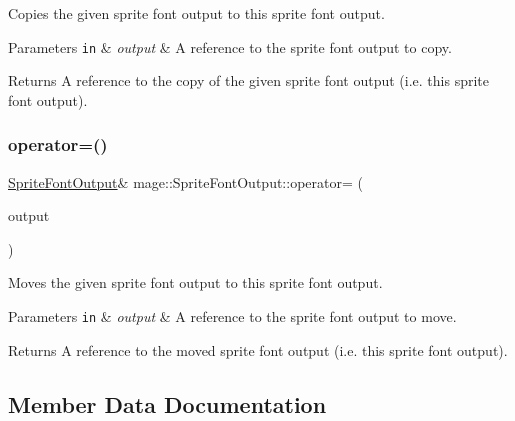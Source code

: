 Copies the given sprite font output to this sprite font output.


\begin{DoxyParams}[1]{Parameters}
\mbox{\tt in}  & {\em output} & A reference to the sprite font output to copy. \\
\hline
\end{DoxyParams}
\begin{DoxyReturn}{Returns}
A reference to the copy of the given sprite font output (i.\+e. this sprite font output). 
\end{DoxyReturn}
\hypertarget{structmage_1_1_sprite_font_output_a5433b918576d7e6724ed46046724a753}{}\label{structmage_1_1_sprite_font_output_a5433b918576d7e6724ed46046724a753} 
\subsubsection{\texorpdfstring{operator=()}{operator=()}\hspace{0.1cm}{\footnotesize\ttfamily [2/2]}}
{\footnotesize\ttfamily \hyperlink{structmage_1_1_sprite_font_output}{Sprite\+Font\+Output}\& mage\+::\+Sprite\+Font\+Output\+::operator= (\begin{DoxyParamCaption}\item[{\hyperlink{structmage_1_1_sprite_font_output}{Sprite\+Font\+Output} \&\&}]{output }\end{DoxyParamCaption})\hspace{0.3cm}{\ttfamily [delete]}}

Moves the given sprite font output to this sprite font output.


\begin{DoxyParams}[1]{Parameters}
\mbox{\tt in}  & {\em output} & A reference to the sprite font output to move. \\
\hline
\end{DoxyParams}
\begin{DoxyReturn}{Returns}
A reference to the moved sprite font output (i.\+e. this sprite font output). 
\end{DoxyReturn}


\subsection{Member Data Documentation}
\hypertarget{structmage_1_1_sprite_font_output_a137cca7a8a91c623272b345e9931ca80}{}\label{structmage_1_1_sprite_font_output_a137cca7a8a91c623272b345e9931ca80} 
